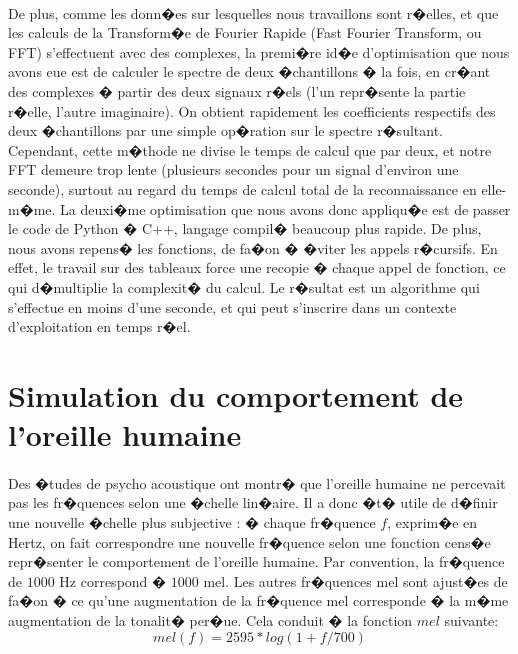 {\paragraph{}
De plus, comme les donn�es sur lesquelles nous travaillons sont r�elles, et que les calculs de la Transform�e de Fourier Rapide (Fast Fourier Transform, ou FFT) 
s'effectuent avec des complexes, la premi�re id�e d'optimisation que nous avons eue est de calculer le spectre de deux �chantillons � la fois, en cr�ant 
des complexes � partir des deux signaux r�els (l'un repr�sente la partie r�elle, l'autre imaginaire). On obtient rapidement les coefficients 
respectifs des deux �chantillons par une simple op�ration sur le spectre r�sultant. Cependant, cette m�thode ne divise le temps de calcul que par deux, et notre 
FFT demeure trop lente (plusieurs secondes pour un signal d'environ une seconde), surtout au regard du temps de calcul total de la reconnaissance en elle-m�me. 
La deuxi�me optimisation que nous avons donc appliqu�e est de passer le code de Python � C++, langage compil� beaucoup plus rapide. De plus, nous avons repens� les
fonctions, de fa�on � �viter les appels r�cursifs. En effet, le travail sur des tableaux force une recopie � chaque appel de fonction, ce qui d�multiplie la complexit� du calcul. 
Le r�sultat est un algorithme qui s'effectue en moins d'une seconde, et qui peut s'inscrire dans un contexte d'exploitation en temps r�el.


        	\section{Simulation du comportement de l'oreille humaine}
        	\paragraph{}
        	Des �tudes de psycho acoustique ont montr� que l'oreille humaine ne percevait pas les fr�quences selon une �chelle lin�aire\cite{melproof}. Il a donc �t� utile de d�finir une nouvelle �chelle plus subjective : � chaque fr�quence $f$, exprim�e en Hertz, on fait correspondre une nouvelle fr�quence selon une fonction cens�e repr�senter le comportement de l'oreille humaine. Par convention, la fr�quence de $1 000$ Hz correspond � $1 000$ mel. Les autres fr�quences mel sont ajust�es de fa�on � ce qu'une augmentation de la fr�quence mel corresponde � la m�me augmentation de la tonalit� per�ue. Cela conduit � la fonction $mel$ suivante: \[mel(f) = 2595*log(1+f/700)\]
        	
}
